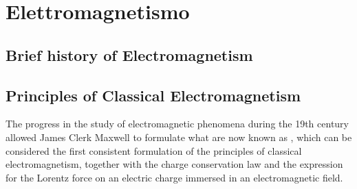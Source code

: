 \documentclass[letterpaper,10pt,italian]{jupyterBook}
\begin{document}
\sphinxAtStartPar
{\hyperref[\detokenize{ch/waves:classical-electromagnetism-waves}]{}}

\sphinxAtStartPar
{\hyperref[\detokenize{ch/circuits:classical-electromagnetism-circuits}]{}}  

\sphinxAtStartPar
{}

\sphinxAtStartPar
{\hyperref[\detokenize{ch/optics:classical-electromagnetism-optics}]{}}

\sphinxAtStartPar
{}  

\sphinxstepscope


\part{Elettromagnetismo}

\sphinxstepscope




\chapter{Brief history of Electromagnetism}
\label{\detokenize{ch/experiments:brief-history-of-electromagnetism}}\label{\detokenize{ch/experiments:classical-electromagnetism-first-experiments}}\label{\detokenize{ch/experiments::doc}}
\sphinxstepscope




\chapter{Principles of Classical Electromagnetism}
\label{\detokenize{ch/principles:principles-of-classical-electromagnetism}}\label{\detokenize{ch/principles:classical-electromagnetism-principles}}\label{\detokenize{ch/principles::doc}}
\sphinxAtStartPar
The progress in the study of electromagnetic phenomena during the 19th century allowed James Clerk Maxwell to formulate what are now known as , which can be considered the first consistent formulation of the principles of classical electromagnetism, together with the charge conservation law and the expression for the Lorentz force on an electric charge immersed in an electromagnetic field.
\end{document}
